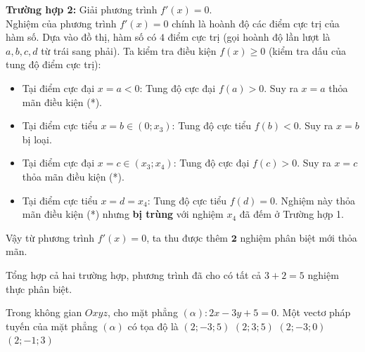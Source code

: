 \begin{ex}
{		\textbf{Trường hợp 2:} Giải phương trình $f'(x) = 0$.\\
		Nghiệm của phương trình $f'(x) = 0$ chính là hoành độ các điểm cực trị của hàm số. Dựa vào đồ thị, hàm số có $4$ điểm cực trị (gọi hoành độ lần lượt là $a, b, c, d$ từ trái sang phải). Ta kiểm tra điều kiện $f(x) \ge 0$ (kiểm tra dấu của tung độ điểm cực trị):
		\begin{itemize}
			\item Tại điểm cực đại $x = a < 0$: Tung độ cực đại $f(a) > 0$. Suy ra $x=a$ thỏa mãn điều kiện (*).
			\item Tại điểm cực tiểu $x = b \in (0; x_3)$: Tung độ cực tiểu $f(b) < 0$. Suy ra $x=b$ bị loại.
			\item Tại điểm cực đại $x = c \in (x_3; x_4)$: Tung độ cực đại $f(c) > 0$. Suy ra $x=c$ thỏa mãn điều kiện (*).
			\item Tại điểm cực tiểu $x = d = x_4$: Tung độ cực tiểu $f(d) = 0$. Nghiệm này thỏa mãn điều kiện (*) nhưng \textbf{bị trùng} với nghiệm $x_4$ đã đếm ở Trường hợp 1.
		\end{itemize}
		Vậy từ phương trình $f'(x) = 0$, ta thu được thêm $\mathbf{2}$ nghiệm phân biệt mới thỏa mãn.
		
		Tổng hợp cả hai trường hợp, phương trình đã cho có tất cả $3 + 2 = 5$ nghiệm thực phân biệt.
	}
\end{ex}

\begin{ex}%
	Trong không gian $Oxyz$, cho mặt phẳng $(\alpha)\colon 2x-3y+5=0$. Một vectơ pháp tuyến của mặt phẳng $(\alpha)$ có tọa độ là
	\choice
	{$(2;-3;5)$}
	{$(2;3;5)$}
	{\True $(2;-3;0)$}
	{$(2;-1;3)$}
\end{ex}

